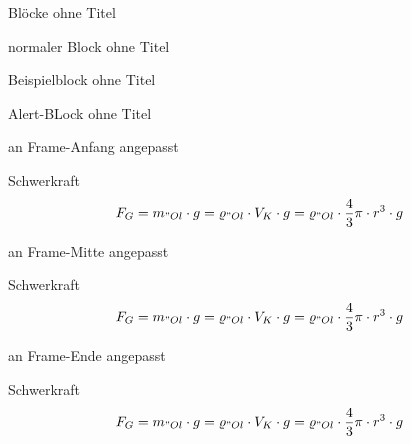 \begin{frame}{Blöcke ohne Titel}
    \begin{block}{}
        normaler Block ohne Titel
    \end{block}
    \begin{exampleblock}{}
        Beispielblock ohne Titel
    \end{exampleblock}
    \begin{alertblock}{}
        Alert-BLock ohne Titel
    \end{alertblock}
\end{frame}
\begin{frame}[t]{an Frame-Anfang angepasst}
    \begin{block}{Schwerkraft}
        \begin{align*}
            F_G = m_{"Ol}\cdot g = \varrho_{"Ol} \cdot V_K \cdot g = \varrho_{"Ol} \cdot \frac{4}{3}\pi \cdot r^3 \cdot g 
        \end{align*}
    \end{block}
\end{frame}

\begin{frame}[c]{an Frame-Mitte angepasst}
    \begin{block}{Schwerkraft}
        \begin{align*}
            F_G = m_{"Ol}\cdot g = \varrho_{"Ol} \cdot V_K \cdot g = \varrho_{"Ol} \cdot \frac{4}{3}\pi \cdot r^3 \cdot g 
        \end{align*}
    \end{block}
\end{frame}

\begin{frame}[b]{an Frame-Ende angepasst}
    \begin{block}{Schwerkraft}
        \begin{align*}
            F_G = m_{"Ol}\cdot g = \varrho_{"Ol} \cdot V_K \cdot g = \varrho_{"Ol} \cdot \frac{4}{3}\pi \cdot r^3 \cdot g 
        \end{align*}
    \end{block}
\end{frame}

